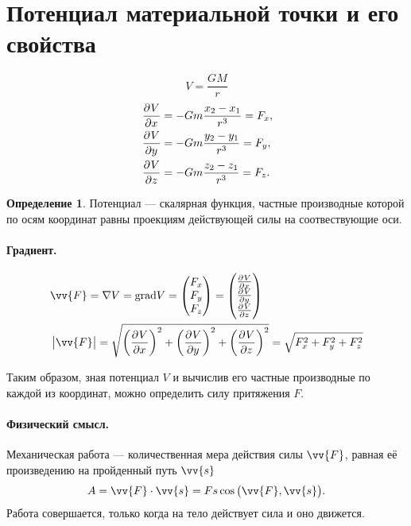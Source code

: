 \documentclass[11pt, a4paper]{article}
\theoremstyle{plain}
\theoremstyle{definition}
\newtheorem{definition}{Определение}
\theoremstyle{remark}
\begin{document}
\section{Потенциал материальной точки и его свойства}
\begin{equation*}
    V = \dfrac{GM}{r}
\end{equation*}
\begin{align*}
    & \dpd{V}{x} = -Gm \dfrac{x_2 - x_1}{r^3} = F_x, \\
    & \dpd{V}{y} = -Gm \dfrac{y_2 - y_1}{r^3} = F_y,\\
    & \dpd{V}{z} = -Gm \dfrac{z_2 - z_1}{r^3} = F_z.
\end{align*}
\begin{definition}
    Потенциал --- скалярная функция, частные производные которой по осям координат равны проекциям
    действующей силы на соотвествующие оси.
\end{definition}
\paragraph{Градиент.} 
\begin{align*}
    &\vv{F} = \nabla V = \textrm{grad} V = \begin{pmatrix}
    F_x \\ F_y \\ F_z \end{pmatrix} = \begin{pmatrix}
        \pd{V}{x}\\\pd{V}{y}\\\pd{V}{z} 
    \end{pmatrix}\\
    &\left| \vv{F} \right| = \sqrt{\left( \dpd{V}{x} \right)^2 +\left( \dpd{V}{y} \right)^2 + \left( \dpd{V}{z} \right)^2} =
    \sqrt{F_x^2 + F_y^2 + F_z^2}
\end{align*}

Таким образом, зная потенциал $V$ и вычислив его частные производные по каждой из координат, можно
определить силу притяжения $F$. 

\paragraph{Физический смысл.}
Механическая работа --- количественная мера действия силы $\vv{F}$, равная её произведению 
на пройденный путь $\vv{s}$
\begin{equation*}
    A = \vv{F}\cdot\vv{s} = Fs\cos{\left( \vv{F}, \vv{s} \right)}.
\end{equation*}
Работа совершается, только когда на тело действует сила и оно движется.
\end{document}
